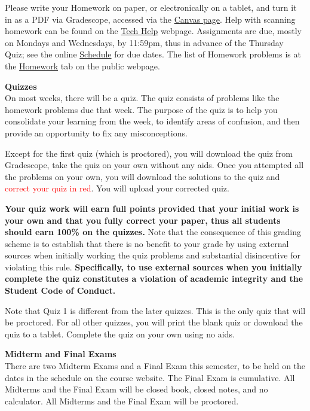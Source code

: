 \documentclass[12pt]{article}
\renewcommand{\emph}[1]{\textsf{\textbf{#1}}}
\newcommand{\localhead}[1]{\par\smallskip\textbf{#1} \smallskip\nobreak\\}%
\def\heading#1{\localhead{\large\emph{#1}}}
\begin{document}
Please write your Homework on paper, or electronically on a tablet, and turn it in as a PDF via Gradescope, accessed via the \href{https://canvas.alaska.edu/courses/16194}{Canvas page}.  Help with scanning homework can be found on the \href{https://uaf-math251.github.io/techHelp.html}{Tech Help} webpage.  Assignments are due, mostly on Mondays and Wednesdays, by 11:59pm, thus in advance of the Thursday Quiz; see the online  \href{https://docs.google.com/spreadsheets/d/e/2PACX-1vSetyTdOP14yatuWNH7CuB9yCT3zqOhFWYmCj1BzRAZhU4eHCXCJaRjnCgxgZW_NieE59iLRok3NdzK/pubhtml?gid=0&single=true}{Schedule} for due dates.  The list of Homework problems is at the \href{https://uaf-math251.github.io/calc2/homework.html}{Homework} tab on the public webpage.

\heading{Quizzes}
On most weeks, there will be a quiz.  The quiz consists of problems like the homework problems due that week. The purpose of the quiz is to help you consolidate your learning from the week, to identify areas of confusion, and then provide an opportunity to fix any misconceptions.  

Except for the first quiz (which is proctored), you will download the quiz from Gradescope, take the quiz on your own without any aids. Once you attempted all the problems on your own, you will download the solutions to the quiz and \textcolor{red}{correct your quiz in red}. You will upload your corrected quiz. 

\textbf{Your quiz work will earn full points provided that your initial work is your own and that you fully correct your paper, thus all students should earn 100\% on the quizzes.} Note that the consequence of this grading scheme is to establish that there is no benefit to your grade by using external sources when initially working the quiz problems and substantial disincentive for violating this rule. \textbf{Specifically, to use external sources when you initially complete the quiz constitutes a violation of academic integrity and the Student Code of Conduct. }

Note that Quiz 1 is different from the later quizzes. This is the only quiz that will be proctored. For all other quizzes, you will print the blank quiz or download the quiz to a tablet. Complete the quiz on your own using no aids. 

\heading{Midterm and Final Exams}
There are two Midterm Exams and a Final Exam this semester, to be held on the dates in the schedule on the course website. The Final Exam is cumulative. All Midterms and the Final Exam will be closed book, closed notes, and no calculator. All Midterms and the Final Exam will be proctored.\\
\end{document}
